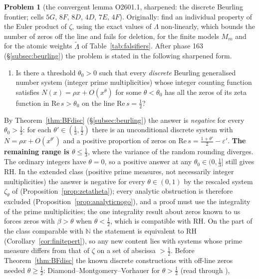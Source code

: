 \documentclass[11pt]{amsart}
\theoremstyle{definition}
\newtheorem{problem}{Problem}
\theoremstyle{remark}
\newcommand{\N}{\mathbb N}
\newcommand{\Rel}{\mathrm{Re}\,}
\begin{document}
\begin{problem}[the convergent lemma O2601.1, sharpened: the discrete Beurling frontier; cells $5G$, $8F$, $8D$, $4D$, $7E$, $4F$]\label{prob:6}
Originally: find an individual property of the Euler product of $\zeta$, using the exact values of $\Lambda$
non-linearly, which bounds the number of zeros off the line and fails for deletion, for the finite models $M_m$ and
for the atomic weights $\tilde\Lambda$ of Table~\ref{tab:falsifiers}. After phase 163 (\S\ref{subsec:beurling}) the
problem is stated in the following sharpened form.
\begin{enumerate}
\item[$(\mathrm{BF}^{\mathrm{disc}}_\theta)$] Is there a threshold $\theta_0>0$
such that every \emph{discrete} Beurling generalised number system (integer prime multiplicities) whose integer
counting function satisfies $N(x)=\rho x+O(x^\theta)$ for some $\theta<\theta_0$ has all the zeros of its zeta
function in $\Rel s>\theta_0$ on the line $\Rel s=\frac12$?
\end{enumerate}
By Theorem~\ref{thm:BFdisc} (\S\ref{subsec:beurling}) the answer is \emph{negative} for every $\theta_0>\frac13$: for each
$\theta'\in(\frac13,\frac12)$ there is an unconditional discrete system with $N=\rho x+O(x^{\theta'})$ and a positive
proportion of zeros on $\Rel s=\frac{1+\theta'}2-\varepsilon'$. \textbf{The remaining range is $\theta\le\frac13$}, where the
variance of the random rounding diverges. The ordinary integers have $\theta=0$, so a positive answer at any $\theta_0\in(0,\frac13]$ still gives RH. In the extended class
(positive prime measures, not necessarily integer multiplicities) the answer is negative for every $\theta\in(0,1)$ by
the rescaled system $\zeta_\theta$ of \cite[\S6.1]{Broucke2024} (Proposition~\ref{prop:zetatheta}); every analytic
obstruction is therefore excluded (Proposition~\ref{prop:analyticnogo}), and a proof must use the integrality of the
prime multiplicities; the one integrality result about zeros known to us \cite[Rem.~7]{Revesz2023} forces zeros with
$\beta>\theta$ when $\theta<\frac12$, which is compatible with RH. On the part of the class comparable with $\N$ the statement is equivalent to RH
(Corollary~\ref{cor:finitepert}), so any new content lies with systems whose prime measure differs from that of
$\zeta$ on a set of abscissa $>\frac12$. Before Theorem~\ref{thm:BFdisc} the known discrete constructions with off-line zeros needed $\theta\ge\frac12$:
Diamond--Montgomery--Vorhauer for $\theta>\frac12$ \cite{DMV2006} (read through \cite{Broucke2024,BDV2020}),

\end{problem}
\end{document}
